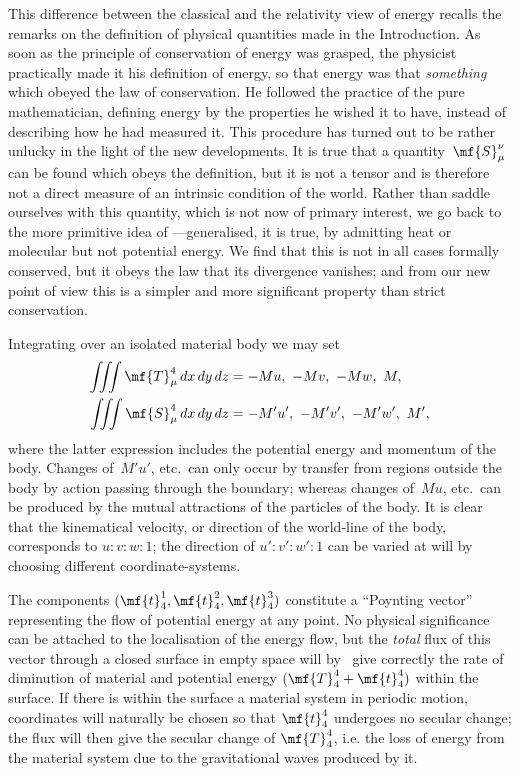 \documentclass[12pt]{book}
\begin{document}
This difference between the classical and the relativity view of energy
recalls the remarks on the definition of physical quantities made in the Introduction.
As soon as the principle of conservation of energy was grasped, the
physicist practically made it his definition of energy, so that energy was that
\emph{something} which obeyed the law of conservation. He followed the practice of
the pure mathematician, defining energy by the properties he wished it to
have, instead of describing how he had measured it. This procedure has turned
out to be rather unlucky in the light of the new developments. It is true that
a quantity~$\mf{S}_{\mu}^{\nu}$ can be found which obeys the definition, but it is not a tensor
and is therefore not a direct measure of an intrinsic condition of the world.
Rather than saddle ourselves with this quantity, which is not now of primary
interest, we go back to the more primitive idea of ---generalised, it is
true, by admitting heat or molecular  but not potential energy. We
find that this is not in all cases formally conserved, but it obeys the law that
its divergence vanishes; and from our new point of view this is a simpler and
more significant property than strict conservation.

Integrating over an isolated material body we may set
\begin{align*}
\iiint \mf{T}_{\mu}^{4}\, dx\, dy\, dz &= -Mu,\ -Mv,\ -Mw,\ M, \\
\iiint \mf{S}_{\mu}^{4}\, dx\, dy\, dz &= -M'u',\ -M'v',\ -M'w',\ M',
\end{align*}
where the latter expression includes the potential energy and momentum of
the body. Changes of~$M'u'$, etc.\ can only occur by transfer from regions outside
the body by action passing through the boundary; whereas changes of~$Mu$,
%
etc.\ can be produced by the mutual attractions of the particles of the
body. It is clear that the kinematical velocity, or direction of the world-line
of the body, corresponds to $u : v : w : 1$; the direction of $u' : v': w' : 1$ can be varied
at will by choosing different coordinate-systems.

The components $(\mf{t}_4^1,\mf{t}_4^2,\mf{t}_4^3)$ constitute a ``Poynting vector'' representing the flow of
potential energy at any point.
No physical significance can be attached to the localisation of the energy flow, but the \emph{total} flux of this
vector through a closed surface in empty space will by~ give correctly the rate of diminution of material
and potential energy $(\mf{T}_4^4 + \mf{t}_4^4)$ within the surface.
If there is within the surface a material system in periodic motion, coordinates will naturally be chosen so that
$\mf{t}_4^4$ undergoes no secular change; the flux will then give the secular change of $\mf{T}_4^4$, i.e. the loss of
energy from the material system due to the gravitational waves produced by it.
\end{document}
